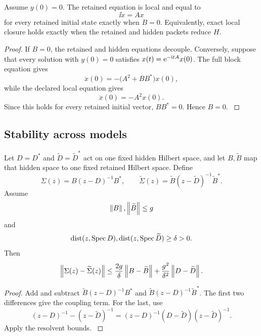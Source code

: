 \begin{theorem}\label{strong:theorem:034}\label{strong:thm:local_closure}
Assume \(y(0)=0\). The retained equation is local and equal to
\[
\ii\dot x=Ax
\]
for every retained initial state exactly when \(B=0\). Equivalently, exact local closure holds exactly when the retained and hidden packets reduce \(H\).
\end{theorem}

\begin{proof}\label{strong:proof:053}
If \(B=0\), the retained and hidden equations decouple. Conversely, suppose that every solution with \(y(0)=0\) satisfies \(x(t)=\e^{-\ii tA}x(0)\). The full block equation gives
\[
\ddot x(0)
=
-\bigl(A^2+BB^*\bigr)x(0),
\]
while the declared local equation gives
\[
\ddot x(0)=-A^2x(0).
\]
Since this holds for every retained initial vector, \(BB^*=0\). Hence \(B=0\).
\label{strong:proof:053:end}\end{proof}

\subsection{Stability across models}\label{strong:subsec:feshbach_stability}

\begin{theorem}\label{strong:theorem:035}\label{strong:thm:self_energy_stability}
Let \(D=D^*\) and \(\widetilde D=\widetilde D^*\) act on one fixed hidden Hilbert space, and let \(B,\widetilde B\) map that hidden space to one fixed retained Hilbert space. Define
\[
\Sigma(z)=B(z-D)^{-1}B^*,
\qquad
\widetilde\Sigma(z)=\widetilde B(z-\widetilde D)^{-1}\widetilde B^*.
\]
Assume
\[
\left\lVert B\right\rVert,\left\lVert\widetilde B\right\rVert\leq g
\]
and
\[
\operatorname{dist}(z,\operatorname{Spec} D),
\operatorname{dist}(z,\operatorname{Spec}\widetilde D)
\geq\delta>0.
\]
Then
\[
\left\lVert\Sigma(z)-\widetilde\Sigma(z)\right\rVert
\leq
\frac{2g}{\delta}\left\lVert B-\widetilde B\right\rVert
+
\frac{g^2}{\delta^2}\left\lVert D-\widetilde D\right\rVert.
\]
\end{theorem}

\begin{proof}\label{strong:proof:054}
Add and subtract \(\widetilde B(z-D)^{-1}B^*\) and \(\widetilde B(z-D)^{-1}\widetilde B^*\). The first two differences give the coupling term. For the last, use
\[
(z-D)^{-1}-(z-\widetilde D)^{-1}
=(z-D)^{-1}(D-\widetilde D)(z-\widetilde D)^{-1}.
\]
Apply the resolvent bounds.
\label{strong:proof:054:end}\end{proof}

